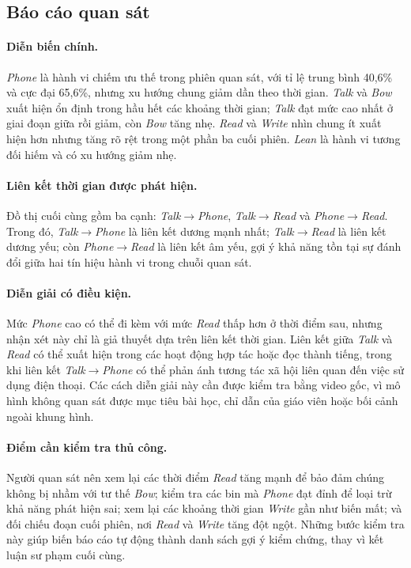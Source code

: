 \subsection{Báo cáo quan sát}

\paragraph{Diễn biến chính.}
\textit{Phone} là hành vi chiếm ưu thế trong phiên quan sát, với tỉ lệ trung bình 40,6\% và cực đại 65,6\%, nhưng xu hướng chung giảm dần theo thời gian. \textit{Talk} và \textit{Bow} xuất hiện ổn định trong hầu hết các khoảng thời gian; \textit{Talk} đạt mức cao nhất ở giai đoạn giữa rồi giảm, còn \textit{Bow} tăng nhẹ. \textit{Read} và \textit{Write} nhìn chung ít xuất hiện hơn nhưng tăng rõ rệt trong một phần ba cuối phiên. \textit{Lean} là hành vi tương đối hiếm và có xu hướng giảm nhẹ.

\paragraph{Liên kết thời gian được phát hiện.}
Đồ thị cuối cùng gồm ba cạnh: \textit{Talk}\(\rightarrow\)\textit{Phone}, \textit{Talk}\(\rightarrow\)\textit{Read} và \textit{Phone}\(\rightarrow\)\textit{Read}. Trong đó, \textit{Talk}\(\rightarrow\)\textit{Phone} là liên kết dương mạnh nhất; \textit{Talk}\(\rightarrow\)\textit{Read} là liên kết dương yếu; còn \textit{Phone}\(\rightarrow\)\textit{Read} là liên kết âm yếu, gợi ý khả năng tồn tại sự đánh đổi giữa hai tín hiệu hành vi trong chuỗi quan sát.

\paragraph{Diễn giải có điều kiện.}
Mức \textit{Phone} cao có thể đi kèm với mức \textit{Read} thấp hơn ở thời điểm sau, nhưng nhận xét này chỉ là giả thuyết dựa trên liên kết thời gian. Liên kết giữa \textit{Talk} và \textit{Read} có thể xuất hiện trong các hoạt động hợp tác hoặc đọc thành tiếng, trong khi liên kết \textit{Talk}\(\rightarrow\)\textit{Phone} có thể phản ánh tương tác xã hội liên quan đến việc sử dụng điện thoại. Các cách diễn giải này cần được kiểm tra bằng video gốc, vì mô hình không quan sát được mục tiêu bài học, chỉ dẫn của giáo viên hoặc bối cảnh ngoài khung hình.

\paragraph{Điểm cần kiểm tra thủ công.}
Người quan sát nên xem lại các thời điểm \textit{Read} tăng mạnh để bảo đảm chúng không bị nhầm với tư thế \textit{Bow}; kiểm tra các bin mà \textit{Phone} đạt đỉnh để loại trừ khả năng phát hiện sai; xem lại các khoảng thời gian \textit{Write} gần như biến mất; và đối chiếu đoạn cuối phiên, nơi \textit{Read} và \textit{Write} tăng đột ngột. Những bước kiểm tra này giúp biến báo cáo tự động thành danh sách gợi ý kiểm chứng, thay vì kết luận sư phạm cuối cùng.

